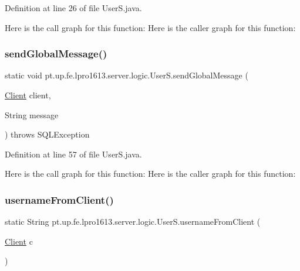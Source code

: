 Definition at line 26 of file User\+S.\+java.

Here is the call graph for this function\+:
Here is the caller graph for this function\+:
\hypertarget{classpt_1_1up_1_1fe_1_1lpro1613_1_1server_1_1logic_1_1_user_s_af6142b2b17e9ff980cb39481dfd98a26}{}\label{classpt_1_1up_1_1fe_1_1lpro1613_1_1server_1_1logic_1_1_user_s_af6142b2b17e9ff980cb39481dfd98a26} 
\subsubsection{\texorpdfstring{send\+Global\+Message()}{sendGlobalMessage()}}
{\footnotesize\ttfamily static void pt.\+up.\+fe.\+lpro1613.\+server.\+logic.\+User\+S.\+send\+Global\+Message (\begin{DoxyParamCaption}\item[{\hyperlink{classpt_1_1up_1_1fe_1_1lpro1613_1_1server_1_1conn_1_1_client}{Client}}]{client,  }\item[{String}]{message }\end{DoxyParamCaption}) throws S\+Q\+L\+Exception\hspace{0.3cm}{\ttfamily [static]}}



Definition at line 57 of file User\+S.\+java.

Here is the call graph for this function\+:
Here is the caller graph for this function\+:
\hypertarget{classpt_1_1up_1_1fe_1_1lpro1613_1_1server_1_1logic_1_1_user_s_a26c28666f4e6461ee06eecfe1f55356d}{}\label{classpt_1_1up_1_1fe_1_1lpro1613_1_1server_1_1logic_1_1_user_s_a26c28666f4e6461ee06eecfe1f55356d} 
\subsubsection{\texorpdfstring{username\+From\+Client()}{usernameFromClient()}}
{\footnotesize\ttfamily static String pt.\+up.\+fe.\+lpro1613.\+server.\+logic.\+User\+S.\+username\+From\+Client (\begin{DoxyParamCaption}\item[{\hyperlink{classpt_1_1up_1_1fe_1_1lpro1613_1_1server_1_1conn_1_1_client}{Client}}]{c }\end{DoxyParamCaption})\hspace{0.3cm}{\ttfamily [static]}}



